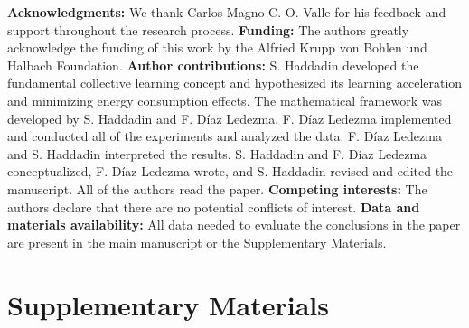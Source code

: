 \documentclass[12pt]{article}
\begin{document}
\textbf{Acknowledgments:}
We thank Carlos Magno C. O. Valle for his feedback and support throughout the research process. \textbf{Funding:} The authors greatly acknowledge the funding of this work by the Alfried Krupp von Bohlen und Halbach Foundation. \textbf{Author contributions:} S. Haddadin developed the fundamental collective learning concept and hypothesized its learning acceleration and minimizing energy consumption effects.  The mathematical framework was developed by S. Haddadin and F. Díaz Ledezma. F. Díaz Ledezma implemented and conducted all of the experiments and analyzed the data. F. Díaz Ledezma and S. Haddadin interpreted the results. S. Haddadin and F. Díaz Ledezma conceptualized, F. Díaz Ledezma wrote, and S. Haddadin revised and edited the manuscript. All of the authors read the paper. \textbf{Competing interests:} The authors declare that there are no potential conflicts of interest. \textbf{Data and materials availability:} All data needed to evaluate the conclusions in the paper are present in the main manuscript or the Supplementary Materials. %

 \newpage
 \beginsupplement
 \section*{Supplementary Materials}\label{sec:supplementary_materials}
 
\end{document}
